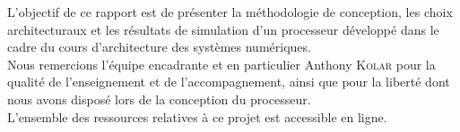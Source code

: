 L'objectif de ce rapport est de présenter la méthodologie de conception, les
choix architecturaux et les résultats de simulation d'un processeur développé
dans le cadre du cours d'architecture des systèmes numériques. \\

Nous remercions l'équipe encadrante et en particulier Anthony \textsc{Kolar}
pour la qualité de l'enseignement et de l'accompagnement, ainsi que pour la
liberté dont nous avons disposé lors de la conception du processeur. \\

L'ensemble des ressources relatives à ce projet est accessible en ligne\cite{repo}.
